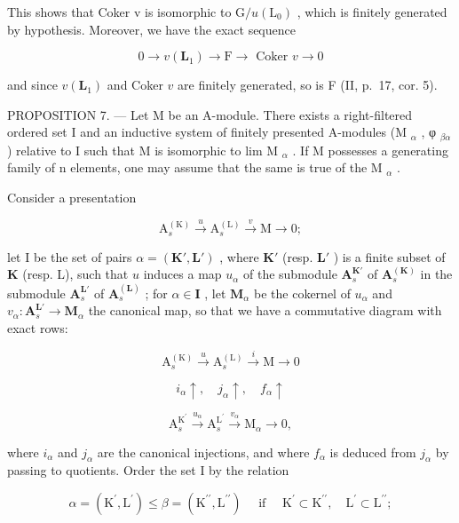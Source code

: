 This shows that Coker v is isomorphic to \(\mathrm{G}/u(\mathrm{L}_{0})\) , which is finitely generated by hypothesis. Moreover, we have the exact sequence

\[
0 \rightarrow v (\mathbf {L} _ {1}) \rightarrow \mathrm{F} \rightarrow \text { Coker } v \rightarrow 0
\]

and since \(v(\mathbf{L}_1)\) and Coker \(v\) are finitely generated, so is F (II, p.~17, cor. 5).

PROPOSITION 7. --- Let M be an A-module. There exists a right-filtered ordered set I and an inductive system of finitely presented A-modules (M \(_{\alpha}\) , φ \(_{\beta\alpha}\) ) relative to I such that M is isomorphic to lim M \(_{\alpha}\) . If M possesses a generating family of n elements, one may assume that the same is true of the M \(_{\alpha}\) .

Consider a presentation

\[
\mathrm{A} _ {s} ^ {(\mathrm{K})} \xrightarrow {u} \mathrm{A} _ {s} ^ {(\mathrm{L})} \xrightarrow {v} \mathrm{M} \longrightarrow 0;
\]

let I be the set of pairs \(\alpha = (\mathbf{K}', \mathbf{L}')\) , where \(\mathbf{K}'\) (resp. \(\mathbf{L}'\) ) is a finite subset of \(\mathbf{K}\) (resp. L), such that \(u\) induces a map \(u_{\alpha}\) of the submodule \(\mathbf{A}_s^{\mathbf{K}'}\) of \(\mathbf{A}_s^{(\mathbf{K})}\) in the submodule \(\mathbf{A}_s^{\mathbf{L}'}\) of \(\mathbf{A}_s^{(\mathbf{L})}\) ; for \(\alpha \in \mathbf{I}\) , let \(\mathbf{M}_{\alpha}\) be the cokernel of \(u_{\alpha}\) and \(v_{\alpha}: \mathbf{A}_s^{\mathbf{L}'} \to \mathbf{M}_{\alpha}\) the canonical map, so that we have a commutative diagram with exact rows:

\[
\mathrm{A} _ {s} ^ {(\mathrm{K})} \xrightarrow {u} \mathrm{A} _ {s} ^ {(\mathrm{L})} \xrightarrow {i} \mathrm{M} \longrightarrow 0
\]

\[
i _ {\alpha} \uparrow , \quad j _ {\alpha} \uparrow , \quad f _ {\alpha} \uparrow
\]

\[
\mathrm{A} _ {s} ^ {\mathrm{K} ^ {\prime}} \xrightarrow {u _ {\alpha}} \mathrm{A} _ {s} ^ {\mathrm{L} ^ {\prime}} \xrightarrow {v _ {\alpha}} \mathrm{M} _ {\alpha} \longrightarrow 0,
\]

where \(i_{\alpha}\) and \(j_{\alpha}\) are the canonical injections, and where \(f_{\alpha}\) is deduced from \(j_{\alpha}\) by passing to quotients. Order the set I by the relation

\[
\alpha = \left(\mathrm{K} ^ {\prime}, \mathrm{L} ^ {\prime}\right) \leqslant \beta = \left(\mathrm{K} ^ {\prime \prime}, \mathrm{L} ^ {\prime \prime}\right) \quad \text { if } \quad \mathrm{K} ^ {\prime} \subset \mathrm{K} ^ {\prime \prime}, \quad \mathrm{L} ^ {\prime} \subset \mathrm{L} ^ {\prime \prime};
\]

